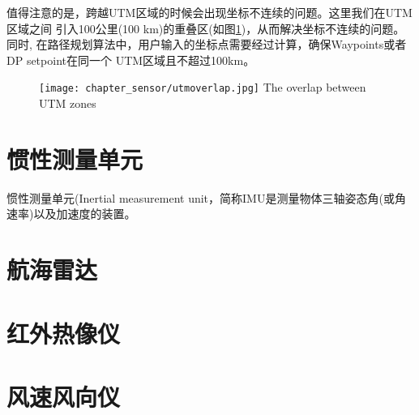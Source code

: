 值得注意的是，跨越UTM区域的时候会出现坐标不连续的问题。这里我们在UTM区域之间
引入100公里(100 km)的重叠区(如图\ref{fig:utmoverlap})，从而解决坐标不连续的问题。同时,
在路径规划算法中，用户输入的坐标点需要经过计算，确保Waypoints或者DP setpoint在同一个
UTM区域且不超过100km。

\begin{figure}[!htp]
  \centering
  \texttt{[image: chapter\_sensor/utmoverlap.jpg]}
    {The overlap between UTM zones}
  \label{fig:utmoverlap}
\end{figure}


\section{惯性测量单元}
惯性测量单元(Inertial measurement unit，简称IMU是测量物体三轴姿态角(或角速率)以及加速度的装置。

\section{航海雷达}
\section{红外热像仪}
\section{风速风向仪}
